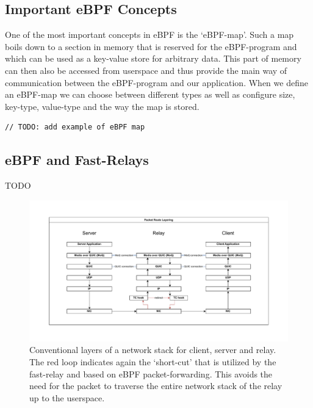 \subsection{Important eBPF Concepts}
One of the most important concepts in eBPF is the `eBPF-map'.
Such a map boils down to a section in memory that is reserved for the eBPF-program
and which can be used as a key-value store for arbitrary data.
This part of memory can then also be accessed from userspace and thus provide the main 
way of communication between the eBPF-program and our application.
When we define an eBPF-map we can choose between different types as well as configure
size, key-type, value-type and the way the map is stored. %


\begin{lstlisting}[style=CStyle]
    // TODO: add example of eBPF map
\end{lstlisting}


\subsection{eBPF and Fast-Relays}
TODO

\begin{figure}[htbp]
    \centering
    \includegraphics[width=\textwidth]{figures/02_background/route-layering.drawio.pdf}
    \caption{Conventional layers of a network stack for client, server and relay.
    The red loop indicates again the `short-cut' that is utilized by the fast-relay and 
    based on eBPF packet-forwarding.
    This avoids the need for the packet to traverse the entire network stack of the relay 
    up to the userspace.}\label{fig:route-layering}
\end{figure}
